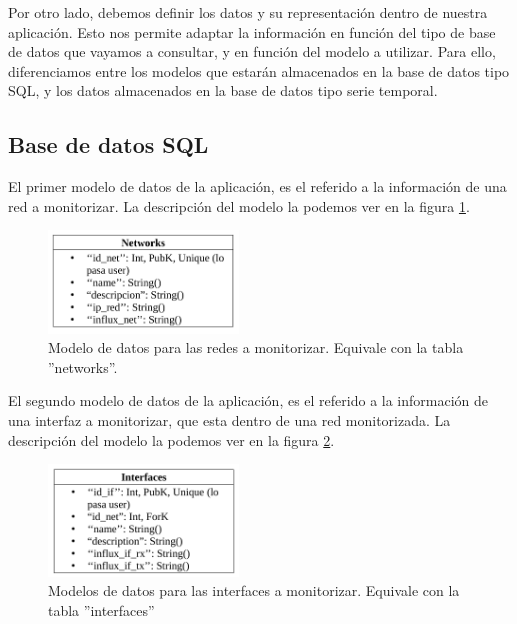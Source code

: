 \documentclass[a4paper, oneside, 12pt]{book}
\begin{document}
	\noindent Por otro lado, debemos definir los datos y su representación dentro de nuestra aplicación. Esto nos permite adaptar la información en función del tipo de base de datos que vayamos a consultar, y en función del modelo a utilizar. Para ello, diferenciamos entre los modelos que estarán almacenados en la base de datos tipo SQL, y los datos almacenados en la base de datos tipo serie temporal.
	
	\subsection{Base de datos SQL}
	
	
	\noindent El primer modelo de datos de la aplicación, es el referido a la información de una red a monitorizar. La descripción del modelo la podemos ver en la figura \ref{img: modelo sql networks}.
	
	\begin{figure}[h!]
		\begin{center}
			\includegraphics[width=0.45\textwidth]{img/model_sql_networks.png}
			\caption{Modelo de datos para las redes a monitorizar. Equivale con la tabla ''networks''.}
			\label{img: modelo sql networks}
		\end{center}
	\end{figure}
	
	\noindent El segundo modelo de datos de la aplicación, es el referido a la información de una interfaz a monitorizar, que esta dentro de una red monitorizada. La descripción del modelo la podemos ver en la figura \ref{img: modelo sql interfaces}.
	
	\begin{figure}[h!]
		\begin{center}
			\includegraphics[width=0.45\textwidth]{img/model_sql_interfaces.png}
			\caption{Modelos de datos para las interfaces a monitorizar. Equivale con la tabla ''interfaces''}
			\label{img: modelo sql interfaces}
		\end{center}
	\end{figure}
	
\end{document}

